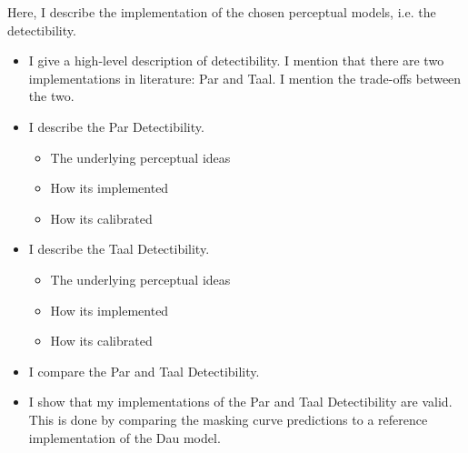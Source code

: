 Here, I describe the implementation of the chosen perceptual models, i.e. the detectibility.
\begin{itemize}
    \item I give a high-level description of detectibility. 
        I mention that there are two implementations in literature: Par and Taal.
        I mention the trade-offs between the two.
    \item I describe the Par Detectibility.
        \begin{itemize}
            \item The underlying perceptual ideas
            \item How its implemented
            \item How its calibrated
        \end{itemize}
    \item I describe the Taal Detectibility.
        \begin{itemize}
            \item The underlying perceptual ideas
            \item How its implemented
            \item How its calibrated
        \end{itemize}
    \item I compare the Par and Taal Detectibility.
    \item I show that my implementations of the Par and Taal Detectibility are valid.
        This is done by comparing the masking curve predictions to a reference implementation of the Dau model.
\end{itemize}
